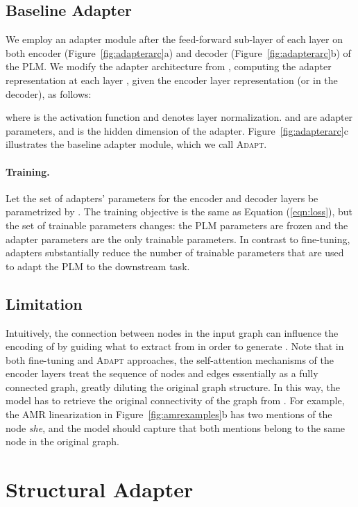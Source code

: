 \documentclass[11pt]{article}
\newcommand{\vanilladapter}{{\small\textsc{Adapt}}\xspace}
\begin{document}
\subsection{Baseline Adapter} We employ an adapter module after the feed-forward sub-layer of each layer on both encoder (Figure~\ref{fig:adapterarc}a) and decoder (Figure~\ref{fig:adapterarc}b) of the PLM. We modify the adapter architecture from \citet{pmlr-v97-houlsby19a}, computing the adapter representation at each layer , given the encoder layer representation  (or  in the decoder), as follows:

where  is the activation function and  denotes layer normalization.  and  are adapter parameters, and  is the hidden dimension of the adapter.
Figure~\ref{fig:adapterarc}c illustrates the baseline adapter module, which we call \vanilladapter. 

\paragraph{Training.} Let the set of adapters' parameters for the encoder and decoder layers be parametrized by . The training objective is the same as Equation (\ref{eqn:loss}), but the set of trainable parameters changes: the PLM parameters  are frozen and the adapter parameters  are the only trainable parameters. In contrast to fine-tuning, adapters substantially reduce the number of trainable parameters that are used to adapt the PLM to the downstream task.

\subsection{Limitation}
\label{sec:intuition}

Intuitively, the connection between nodes in the input graph can influence the encoding of  by guiding what to extract from  in order to generate . Note that in both fine-tuning and \vanilladapter approaches, the self-attention mechanisms of the encoder layers treat the sequence of nodes and edges  essentially as a fully connected graph, greatly diluting the original graph structure. In this way, the model has to retrieve the original connectivity of the graph from . For example, the AMR linearization in Figure~\ref{fig:amrexamples}b has two mentions of the node \emph{she}, and the model should capture that both mentions belong to the same node in the original graph. 

\section{Structural Adapter}
\end{document}
